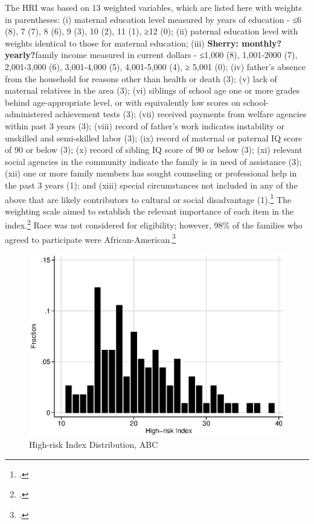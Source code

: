 \begin{appendices}
\noindent The HRI was based on 13 weighted variables, which are listed here with weights in parentheses: (i) maternal education level measured by years of education - ≤6 (8), 7 (7), 8 (6), 9 (3), 10 (2), 11 (1), ≥12 (0); (ii) paternal education level with weights identical to those for maternal education; (iii) \textbf{Sherry: monthly? yearly?}family income measured in current dollars - ≤1,000 (8), 1,001-2000 (7), 2,001-3,000 (6), 3,001-4,000 (5), 4,001-5,000 (4), ≥ 5,001 (0); (iv) father's absence from the household for reasons other than health or death (3); (v) lack of maternal relatives in the area (3); (vi) siblings of school age one or more grades behind age-appropriate level, or with equivalently low scores on school-administered achievement tests (3); (vii) received payments from welfare agencies within past 3 years (3); (viii) record of father's work indicates instability or unskilled and semi-skilled labor (3); (ix) record of maternal or paternal IQ score of 90 or below (3); (x) record of sibling IQ score of 90 or below (3); (xi) relevant social agencies in the community indicate the family is in need of assistance (3); (xii) one or more family members has sought counseling or professional help in the past 3 years (1); and (xiii) special circumstances not included in any of the above that are likely contributors to cultural or social disadvantage (1).\footnote{\citet{Ramey_Smith_1977_AJMD, Ramey_Campbell_1984_AJMD,Ramey_Campbell_1991_childreninpoverty,Ramey_Campbell_etal_2000_ADS}.} The weighting scale aimed to establish the relevant importance of each item in the index.\footnote{\citet{Ramey_Smith_1977_AJMD}.} Race was not  considered for eligibility; however, 98\% of the families who agreed to participate were African-American.\footnote{\citet{Ramey_Smith_1977_AJMD,Ramey_Campbell_1979_SR}.} \\

\begin{center}
	\begin{figure}[H]
		\caption{High-risk Index Distribution, ABC} \label{figure:hridistabc}
		\centering
		\includegraphics[width=.9\columnwidth]{output/abc_hri.eps}
	\end{figure}
\end{center}


\end{appendices}
